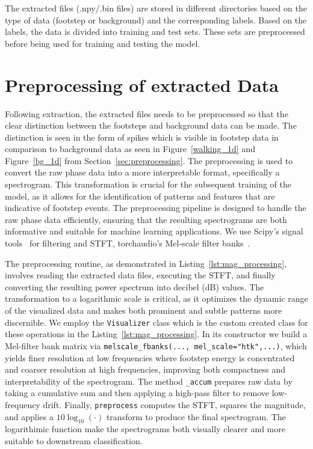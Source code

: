 The extracted files (.npy/.bin files) are stored in different directories based on the type of data (footstep or background) and the corresponding labels. Based on the labels, the data is divided into training and test sets. 
These sets are preprocessed before being used for training and testing the model. 

\section{Preprocessing of extracted Data}
\label{preproc}
Following extraction, the extracted files needs to be preprocessed so that the clear distinction between the footsteps and background data can be made. The distinction is seen in the form of spikes which is visible in footstep data in comparison to background data as seen in Figure~\ref{walking_1d} and Figure~\ref{bg_1d} from Section~\ref{sec:preprocessing}.  The preprocessing is used to convert the raw phase data into a more interpretable format, specifically a spectrogram. This transformation is crucial for the subsequent training of the model, as it allows for the identification of patterns and features that are indicative of footstep events. The preprocessing pipeline is designed to handle the raw phase data efficiently, ensuring that the resulting spectrograms are both informative and suitable for machine learning applications. We use Scipy's signal tools~\cite{scipy2020} for filtering and STFT, torchaudio's Mel-scale filter banks~\cite{torchaudio2024}.

The preprocessing routine, as demonstrated in Listing~\ref{lst:mag_processing}, involves reading the extracted data files, executing the STFT, and finally converting the resulting power spectrum into decibel (dB) values. The transformation to a logarithmic scale is critical, as it optimizes the dynamic range of the visualized data and makes both prominent and subtle patterns more discernible. We employ the \texttt{Visualizer} class which is the custom created class for these operations in the Listing~\ref{lst:mag_processing}. In its constructor we build a Mel-filter bank matrix via \texttt{melscale\_fbanks(...,~mel\_scale="htk",...)}, which yields finer resolution at low frequencies where footstep energy is concentrated and coarser resolution at high frequencies, improving both compactness and interpretability of the spectrogram. The method \texttt{\_accum} prepares raw data by taking a cumulative sum and then applying a high-pass filter to remove low-frequency drift. Finally, \texttt{preprocess} computes the STFT, squares the magnitude, and applies a $10\log_{10}(\cdot)$ transform to produce the final spectrogram. The logarithimic function make the spectrograms both visually clearer and more suitable to downstream classification. 

